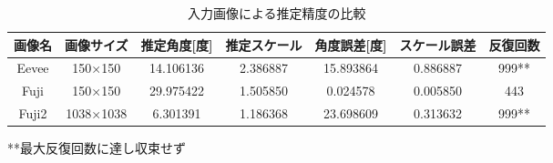 \begin{table}[h]
\centering
\caption{入力画像による推定精度の比較}
\label{tab:image_comparison}
\begin{tabular}{|c|c|c|c|c|c|c|}
\hline
画像名 & 画像サイズ & 推定角度[度] & 推定スケール & 角度誤差[度] & スケール誤差 & 反復回数 \\
\hline
Eevee & 150×150 & 14.106136 & 2.386887 & 15.893864 & 0.886887 & 999** \\
Fuji & 150×150 & 29.975422 & 1.505850 & 0.024578 & 0.005850 & 443 \\
Fuji2 & 1038×1038 & 6.301391 & 1.186368 & 23.698609 & 0.313632 & 999** \\
\hline
\end{tabular}
\end{table}

**最大反復回数に達し収束せず

